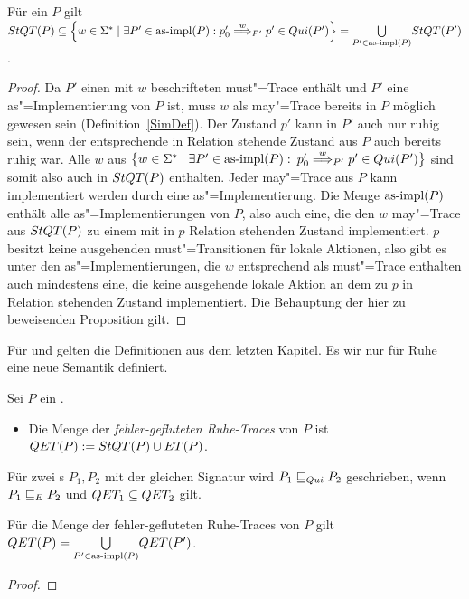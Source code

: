 \begin{Prop}
  \label{QuiTraceProp}
  Für ein \MEIO{} $P$ gilt $\StQT (P) \subseteq \left\{w\in\Sigma ^*\mid
  \exists P'\in\asimp (P): p'_0 \weakmust[w]_{P'} p'\in Qui(P')\right\} =
  \underset{P'\in\asimp (P)}{\bigcup} \StQT (P')$.
\end{Prop}
\begin{proof}
  Da $P'$ einen mit $w$ beschrifteten must"=Trace enthält und $P'$ eine
  as"=Implementierung von $P$ ist, muss $w$ als may"=Trace bereits in $P$
  möglich gewesen sein (Definition~\ref{SimDef}). Der Zustand $p'$ kann in $P'$
  auch nur ruhig sein, wenn der entsprechende in Relation stehende Zustand aus
  $P$ auch bereits ruhig war. Alle $w$ aus $\big\{w\in\Sigma ^*\mid \exists
  P'\in\mathrm{as}\text{-}\mathrm{impl} (P):$ $p'_0 \weakmust[w]_{P'} p'\in Qui(P')\big\}$ sind somit also
  auch in $StQT (P)$ enthalten. Jeder may"=Trace aus $P$ kann implementiert
  werden durch eine as"=Implementierung. Die Menge $\mathrm{as}\text{-}\mathrm{impl} (P)$ enthält alle
  as"=Implementierungen von $P$, also auch eine, die den $w$ may"=Trace aus
  $StQT (P)$ zu einem mit in $p$ Relation stehenden Zustand implementiert. $p$
  besitzt keine ausgehenden must"=Transitionen für lokale Aktionen, also gibt es
  unter den as"=Implementierungen, die $w$ entsprechend als must"=Trace
  enthalten auch mindestens eine, die keine ausgehende lokale Aktion an dem zu
  $p$ in Relation stehenden Zustand implementiert. Die Behauptung der hier zu
  beweisenden Proposition gilt.
\end{proof}

Für \ET{} und \EL{} gelten die Definitionen aus dem letzten Kapitel. Es wir nur
für Ruhe eine neue Semantik definiert.

\begin{Def}
  Sei $P$ ein \MEIO{}.
  \begin{itemize}
    \item Die Menge der \emph{fehler-gefluteten Ruhe-Traces} von $P$ ist $QET
      (P):= StQT (P)\cup ET (P)$.
  \end{itemize}
  Für zwei \MEIO{}s $P_1,P_2$ mit der gleichen Signatur wird $P_1 \sqsubseteq  _{Qui}{} P_2$
  geschrieben, wenn $P_1 \sqsubseteq  _E{} P_2$ und $QET _1\subseteq QET _2$ gilt.
\end{Def}

\begin{Prop}
  Für die Menge der fehler-gefluteten Ruhe-Traces von $P$ gilt $QET (P) =
  \underset{P'\in\mathrm{as}\text{-}\mathrm{impl} (P)}{\bigcup} QET (P')$.
\end{Prop}
\begin{proof}
\end{proof}

